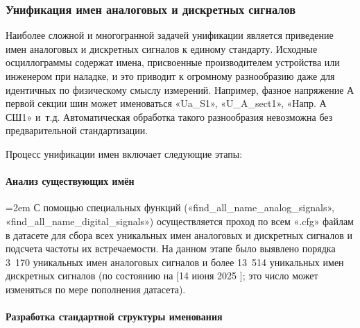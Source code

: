 

\subsubsection{Унификация имен аналоговых и дискретных сигналов}\label{sec:ch3_signal_names_unification}

Наиболее сложной и многогранной задачей унификации является приведение имен аналоговых и
дискретных сигналов к единому стандарту. Исходные осциллограммы содержат имена,
присвоенные производителем устройства или инженером при наладке, и это приводит к
огромному разнообразию даже для идентичных по физическому смыслу измерений. Например,
фазное напряжение А первой секции шин может именоваться «Ua\_S1», «U\_A\_sect1», «Напр.
А СШ1» и~т.д. Автоматическая обработка такого разнообразия невозможна без
предварительной стандартизации.

Процесс унификации имен включает следующие этапы:

\paragraph{Анализ существующих имён}
\mbox{}\par\vspace{0.2cm}

{\emergencystretch=2em С помощью специальных функций («\allowbreak find\_\allowbreak all\_\allowbreak name\_\allowbreak analog\_\allowbreak signals», «\allowbreak find\_\allowbreak all\_\allowbreak name\_\allowbreak digital\_\allowbreak signals») осуществляется проход по всем «.cfg» файлам в датасете для сбора всех уникальных имен аналоговых и дискретных сигналов и подсчета частоты их встречаемости. На данном этапе было выявлено порядка 3~170 уникальных имен аналоговых сигналов и более 13~514 уникальных имен дискретных сигналов (по состоянию на [14 июня 2025 ]; это число может изменяться по мере пополнения датасета).\par}

\paragraph{Разработка стандартной структуры именования}
\mbox{}\par\vspace{0.2cm}

